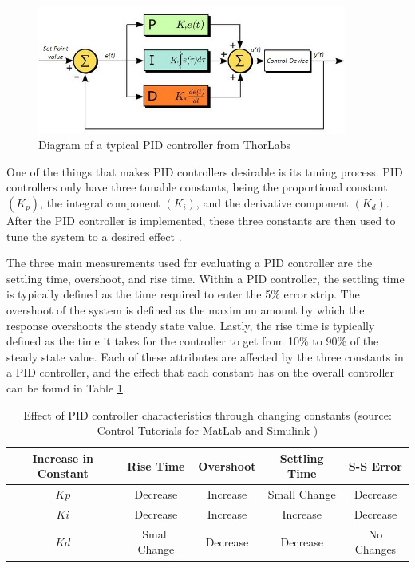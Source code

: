 \documentclass[titlepage, draft]{article}
\begin{document}
{\begin{figure}
	\centering
	\includegraphics[width=4in]{PID2.jpg}
	\caption{Diagram of a typical PID controller from ThorLabs \cite{PIDDiagram}}
	\label{fig:piddiagram}
\end{figure}

One of the things that makes PID controllers desirable is its tuning process. PID controllers only have three tunable constants, being the proportional constant \((K_p)\), the integral component \((K_i)\), and the derivative component \((K_d)\). After the PID controller is implemented, these three constants are then used to tune the system to a desired effect \cite{pid_advantages}.

The three main measurements used for evaluating a PID controller are the settling time, overshoot, and rise time. Within a PID controller, the settling time is typically defined as the time required to enter the 5\% error strip. The overshoot of the system is defined as the maximum amount by which the response overshoots the steady state value. Lastly, the rise time is typically defined as the time it takes for the controller to get from 10\% to 90\% of the steady state value. Each of these attributes are affected by the three constants in a PID controller, and the effect that each constant has on the overall controller can be found in Table \ref{tab:pidvals}.

\begin{table}[H]
	\centering
	\caption{Effect of PID controller characteristics through changing constants (source: Control Tutorials for MatLab and Simulink \cite{pid_characteristics})}
	\begin{tabular}{|c | c | c | c | c |}
		\hline
		Increase in Constant & Rise Time    & Overshoot & Settling Time & S-S Error  \\ [0.5ex]
		\hline
		\(Kp\)               & Decrease     & Increase  & Small Change  & Decrease   \\
		\hline
		\(Ki\)               & Decrease     & Increase  & Increase      & Decrease   \\
		\hline
		\(Kd\)               & Small Change & Decrease  & Decrease      & No Changes \\
		\hline
	\end{tabular}
	\label{tab:pidvals}
\end{table}

}
\end{document}
